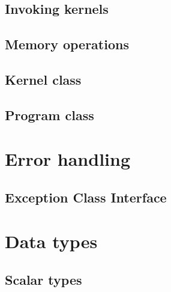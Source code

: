\documentclass[letterpaper,10pt,english]{sphinxmanual}
\begin{document}
\subsection{Invoking kernels}
\label{\detokenize{programming-interface/parallelism/invoking-kernels:invoking-kernels}}\label{\detokenize{programming-interface/parallelism/invoking-kernels::doc}}

\subsection{Memory operations}
\label{\detokenize{programming-interface/parallelism/memory:memory-operations}}\label{\detokenize{programming-interface/parallelism/memory::doc}}

\subsection{Kernel class}
\label{\detokenize{programming-interface/parallelism/kernel:kernel-class}}\label{\detokenize{programming-interface/parallelism/kernel::doc}}

\subsection{Program class}
\label{\detokenize{programming-interface/parallelism/program:program-class}}\label{\detokenize{programming-interface/parallelism/program::doc}}

\section{Error handling}
\label{\detokenize{programming-interface/index:error-handling}}

\subsection{Exception Class Interface}
\label{\detokenize{programming-interface/error/exception:exception-class-interface}}\label{\detokenize{programming-interface/error/exception::doc}}

\section{Data types}
\label{\detokenize{programming-interface/index:data-types}}

\subsection{Scalar types}
\label{\detokenize{programming-interface/types/scalar:scalar-types}}\label{\detokenize{programming-interface/types/scalar::doc}}
\end{document}

